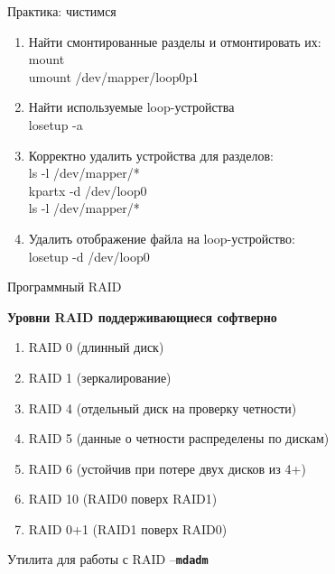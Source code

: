 \documentclass[ignorenonframetext, professionalfonts, hyperref={pdftex, unicode}]{beamer}
\begin{document}
\begin{frame}{Практика: чистимся}
	\begin{enumerate}
		\item Найти смонтированные разделы и отмонтировать их: \\
			mount \\
			umount /dev/mapper/loop0p1
			\pause
		\item Найти используемые loop-устройства\\
			losetup -a \\
			\pause
		\item Корректно удалить устройства для разделов:\\
			ls -l /dev/mapper/* \\
			kpartx -d /dev/loop0 \\
			ls -l /dev/mapper/* \\
			\pause
		\item Удалить отображение файла на loop-устройство: \\
			losetup -d /dev/loop0
	\end{enumerate}
\end{frame}


\begin{frame}{Программный RAID}
  \begin{center}
    \textbf{Уровни RAID поддерживающиеся софтверно}
   \end{center}
   \begin{enumerate}
     \item RAID 0 (длинный диск)
     \pause
     \item RAID 1 (зеркалирование)
     \pause 
     \item RAID 4 (отдельный диск на проверку четности)
     \pause
     \item RAID 5 (данные о четности распределены по дискам)
     \pause
     \item RAID 6 (устойчив при потере двух дисков из 4+)
     \pause
     \item RAID 10 (RAID0 поверх RAID1)
     \pause
     \item RAID 0+1 (RAID1 поверх RAID0)
   \end{enumerate}
   \pause
   Утилита для работы с RAID --\textbf{\tt mdadm}
\end{frame}
\end{document}
